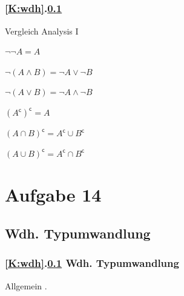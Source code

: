 \documentclass[9pt,german]{beamer}%
\begin{document}
\subsection{\stitle}\label{S:Morgansche}
\begin{frame}[fragile]%
  \frametitle{\ref{K:wdh}.\ref{S:Morgansche} \stitle}%
Vergleich Analysis I
\medskip

\begin{description}
  \item[und bzw. oder]
  \item $\neg \neg A = A$
  \item $\neg (A \wedge B) = \neg A \vee \neg B$
  \item $\neg (A \vee B) = \neg A \wedge \neg B$
\end{description}
\medskip

\begin{description}
  \item[Schnittmenge bzw. Vereinigung]
  \item $(A^{\mathsf{c}})^{\mathsf{c}} = A$
  \item $(A \cap B)^{\mathsf{c}} = A^{\mathsf{c}} \cup B^{\mathsf{c}}$
  \item $(A \cup B)^{\mathsf{c}} = A^{\mathsf{c}} \cap B^{\mathsf{c}}$
\end{description}

\end{frame}


\section{Aufgabe 14}

\def\stitle{Wdh. Typumwandlung}
\subsection{\stitle}\label{S:Typumwandlung}
\begin{frame}[fragile]%
  \frametitle{\ref{K:wdh}.\ref{S:Morgansche} \stitle}%
\medskip

Allgemein .


\end{frame}
\end{document}
